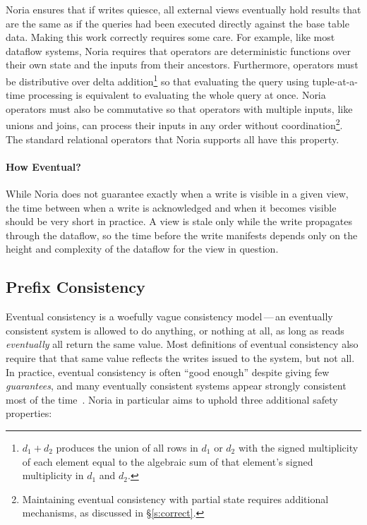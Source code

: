 Noria ensures that if writes quiesce, all external views eventually hold results
that are the same as if the queries had been executed directly against the base
table data. Making this work correctly requires some care. For example, like
most dataflow systems, Noria requires that operators are deterministic functions
over their own state and the inputs from their ancestors. Furthermore, operators
must be distributive over delta addition\footnote{$d_1 + d_2$ produces the union
of all rows in $d_1$ or $d_2$ with the signed multiplicity of each element equal
to the algebraic sum of that element's signed multiplicity in $d_1$ and $d_2$.}
so that evaluating the query using tuple-at-a-time processing is equivalent to
evaluating the whole query at once. Noria operators must also be commutative so
that operators with multiple inputs, like unions and joins, can process their
inputs in any order without coordination\footnote{Maintaining eventual
consistency with partial state requires additional mechanisms, as discussed in
\S\ref{s:correct}.}. The standard relational operators that Noria supports all
have this property.

\paragraph{How Eventual?}
While Noria does not guarantee exactly when a write is visible in a given view,
the time between when a write is acknowledged and when it becomes visible should
be very short in practice. A view is stale only while the write propagates
through the dataflow, so the time before the write manifests depends only on the
height and complexity of the dataflow for the view in question.

\subsection{Prefix Consistency}

Eventual consistency is a woefully vague consistency model\,---\,an eventually
consistent system is allowed to do anything, or nothing at all, as long as reads
\emph{eventually} all return the same value. Most definitions of eventual
consistency also require that that same value reflects the writes issued to the
system, but not all. In practice, eventual consistency is often ``good enough''
despite giving few \emph{guarantees}, and many eventually consistent systems
appear strongly consistent most of the time~\cite{eventual}. Noria in particular
aims to uphold three additional safety properties:

